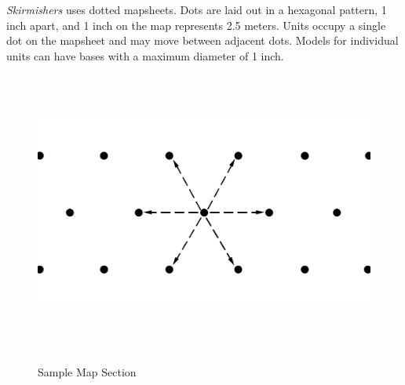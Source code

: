 \emph{Skirmishers} uses dotted mapsheets.
Dots are laid out in a hexagonal pattern, 1 inch apart, and 1 inch on the map represents 2.5 meters.
Units occupy a single dot on the mapsheet and may move between adjacent dots.
Models for individual units can have bases with a maximum diameter of 1 inch.

\begin{figure}[!h]
  \centering
  \includegraphics[alt='Sample dotted mapsheet', width=6.5in, height=3.66in]{img/Map.png}
  \caption*{Sample Map Section}
\end{figure}

